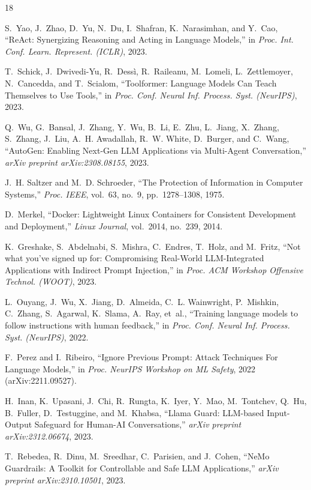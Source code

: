 \documentclass[10pt,twocolumn,letterpaper]{article}
\begin{document}
\begin{thebibliography}{18}

S.~Yao, J.~Zhao, D.~Yu, N.~Du, I.~Shafran, K.~Narasimhan, and Y.~Cao, ``ReAct: Synergizing Reasoning and Acting in Language Models,'' in \emph{Proc. Int. Conf. Learn. Represent. (ICLR)}, 2023.

T.~Schick, J.~Dwivedi-Yu, R.~Dess\`i, R.~Raileanu, M.~Lomeli, L.~Zettlemoyer, N.~Cancedda, and T.~Scialom, ``Toolformer: Language Models Can Teach Themselves to Use Tools,'' in \emph{Proc. Conf. Neural Inf. Process. Syst. (NeurIPS)}, 2023.

Q.~Wu, G.~Bansal, J.~Zhang, Y.~Wu, B.~Li, E.~Zhu, L.~Jiang, X.~Zhang, S.~Zhang, J.~Liu, A.~H. Awadallah, R.~W. White, D.~Burger, and C.~Wang, ``AutoGen: Enabling Next-Gen LLM Applications via Multi-Agent Conversation,'' \emph{arXiv preprint arXiv:2308.08155}, 2023.

J.~H. Saltzer and M.~D. Schroeder, ``The Protection of Information in Computer Systems,'' \emph{Proc. IEEE}, vol.~63, no.~9, pp.~1278--1308, 1975.

D.~Merkel, ``Docker: Lightweight Linux Containers for Consistent Development and Deployment,'' \emph{Linux Journal}, vol.~2014, no.~239, 2014.

K.~Greshake, S.~Abdelnabi, S.~Mishra, C.~Endres, T.~Holz, and M.~Fritz, ``Not what you've signed up for: Compromising Real-World LLM-Integrated Applications with Indirect Prompt Injection,'' in \emph{Proc. ACM Workshop Offensive Technol. (WOOT)}, 2023.

L.~Ouyang, J.~Wu, X.~Jiang, D.~Almeida, C.~L. Wainwright, P.~Mishkin, C.~Zhang, S.~Agarwal, K.~Slama, A.~Ray, et~al., ``Training language models to follow instructions with human feedback,'' in \emph{Proc. Conf. Neural Inf. Process. Syst. (NeurIPS)}, 2022.

F.~Perez and I.~Ribeiro, ``Ignore Previous Prompt: Attack Techniques For Language Models,'' in \emph{Proc. NeurIPS Workshop on ML Safety}, 2022 (arXiv:2211.09527).

H.~Inan, K.~Upasani, J.~Chi, R.~Rungta, K.~Iyer, Y.~Mao, M.~Tontchev, Q.~Hu, B.~Fuller, D.~Testuggine, and M.~Khabsa, ``Llama Guard: LLM-based Input-Output Safeguard for Human-AI Conversations,'' \emph{arXiv preprint arXiv:2312.06674}, 2023.

T.~Rebedea, R.~Dinu, M.~Sreedhar, C.~Parisien, and J.~Cohen, ``NeMo Guardrails: A Toolkit for Controllable and Safe LLM Applications,'' \emph{arXiv preprint arXiv:2310.10501}, 2023.


\end{thebibliography}
\end{document}
